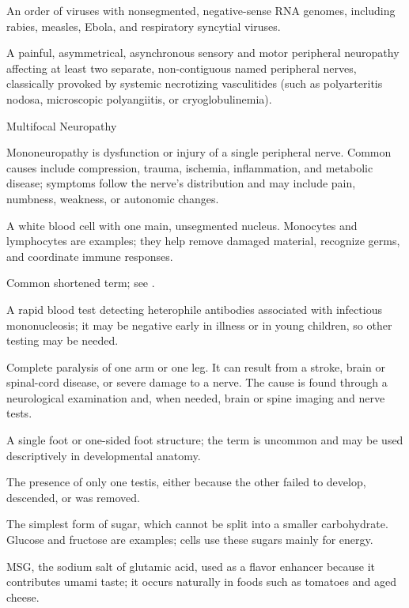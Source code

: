  An order of viruses with nonsegmented, negative-sense RNA genomes, including rabies, measles, Ebola, and respiratory syncytial viruses.

 A painful, asymmetrical, asynchronous sensory and motor peripheral neuropathy affecting at least two separate, non-contiguous named peripheral nerves, classically provoked by systemic necrotizing vasculitides (such as polyarteritis nodosa, microscopic polyangiitis, or cryoglobulinemia).

\synonyms
Multifocal Neuropathy

 Mononeuropathy is dysfunction or injury of a single peripheral nerve. Common causes include compression, trauma, ischemia, inflammation, and metabolic disease; symptoms follow the nerve’s distribution and may include pain, numbness, weakness, or autonomic changes.

 A white blood cell with one main, unsegmented nucleus. Monocytes and lymphocytes are examples; they help remove damaged material, recognize germs, and coordinate immune responses.

 Common shortened term; see .

 A rapid blood test detecting heterophile antibodies associated with infectious mononucleosis; it may be negative early in illness or in young children, so other testing may be needed.

 Complete paralysis of one arm or one leg. It can result from a stroke, brain or spinal-cord disease, or severe damage to a nerve. The cause is found through a neurological examination and, when needed, brain or spine imaging and nerve tests.

 A single foot or one-sided foot structure; the term is uncommon and may be used descriptively in developmental anatomy.

 The presence of only one testis, either because the other failed to develop, descended, or was removed.

 The simplest form of sugar, which cannot be split into a smaller carbohydrate. Glucose and fructose are examples; cells use these sugars mainly for energy.

 MSG, the sodium salt of glutamic acid, used as a flavor enhancer because it contributes umami taste; it occurs naturally in foods such as tomatoes and aged cheese.

